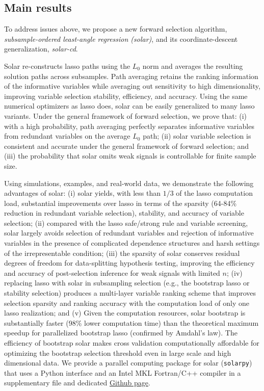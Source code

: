 \documentclass[11pt,review,authoryear]{elsarticle}
\begin{document}
\subsection{Main results}

To address issues above, we propose a new forward selection algorithm, \emph{subsample-ordered least-angle regression (solar)}, and its coordinate-descent generalization, \emph{solar-cd}.

Solar re-constructs lasso paths using the $L_0$ norm and averages the resulting solution paths across subsamples. Path averaging retains the ranking information of the informative variables while averaging out sensitivity to high dimensionality, improving variable selection stability, efficiency, and accuracy. Using the same numerical optimizers as lasso does, solar can be easily generalized to many lasso variants. Under the \citet{zhang09} general framework of forward selection, we prove that: (i) with a high probability, path averaging perfectly separates informative variables from redundant variables on the average $L_0$ path; (ii) solar variable selection is consistent and accurate under the general framework of forward selection; and (iii) the probability that solar omits weak signals is controllable for finite sample size.

Using simulations, examples, and real-world data, we demonstrate the following advantages of solar: (i) solar yields, with less than $1/3$ of the lasso computation load, substantial improvements over lasso in terms of the sparsity (64-84\% reduction in redundant variable selection), stability, and accuracy of variable selection; (ii) compared with the lasso safe/strong rule and variable screening, solar largely avoids selection of redundant variables and rejection of informative variables in the presence of complicated dependence structures and harsh settings of the irrepresentable condition; (iii) the sparsity of solar conserves residual degrees of freedom for data-splitting hypothesis testing, improving the efficiency and accuracy of post-selection inference for weak signals with limited $n$; (iv) replacing lasso with solar in subsampling selection (e.g., the bootstrap lasso or stability selection) produces a multi-layer variable ranking scheme that improves selection sparsity and ranking accuracy with the computation load of only one lasso realization; and (v) Given the computation resources, solar bootstrap is substantially faster (98\% lower computation time) than the theoretical maximum speedup for parallelized bootstrap lasso (confirmed by Amdahl's law). The efficiency of bootstrap solar makes cross validation computationally affordable for optimizing the bootstrap selection threshold even in large scale and high dimensional data. We provide a parallel computing package for solar (\texttt{solarpy}) that uses a Python interface and an Intel MKL Fortran/C++ compiler in a supplementary file and dedicated \href{https://github.com/isaac2math/solarpy}{Github page}.
\end{document}
